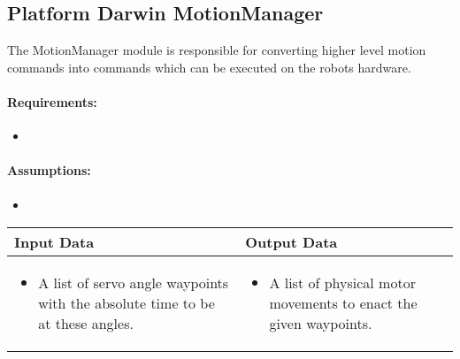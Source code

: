 \documentclass[english,12pt]{scrartcl}
\begin{document}
	\subsection{Platform Darwin MotionManager}
		The MotionManager module is responsible for converting higher level motion commands into commands which can be executed on the robots hardware.
		
		\paragraph{Requirements:}
		\begin{itemize}
			\item {}
		\end{itemize}
		
		\paragraph{Assumptions:}
		\begin{itemize}
			\item {}
		\end{itemize}
		
		\begin{tabular}{p{7cm}|p{7cm}}
			Input Data & Output Data \\ \hline
			\begin{itemize}
				\item A list of servo angle waypoints with the absolute time to be at these angles.
			\end{itemize}
			&
			\begin{itemize}
				\item A list of physical motor movements to enact the given waypoints.
			\end{itemize}
		\end{tabular}
\end{document}
